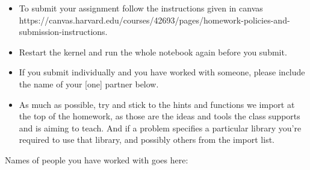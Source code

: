 \documentclass[11pt]{article}
\providecommand{\tightlist}{%
      \setlength{\itemsep}{0pt}\setlength{\parskip}{0pt}}
\begin{document}
\begin{itemize}
\tightlist
\item
  To submit your assignment follow the instructions given in canvas
  https://canvas.harvard.edu/courses/42693/pages/homework-policies-and-submission-instructions.
\item
  Restart the kernel and run the whole notebook again before you submit.
\item
  If you submit individually and you have worked with someone, please
  include the name of your {[}one{]} partner below.
\item
  As much as possible, try and stick to the hints and functions we
  import at the top of the homework, as those are the ideas and tools
  the class supports and is aiming to teach. And if a problem specifies
  a particular library you're required to use that library, and possibly
  others from the import list.
\end{itemize}

    Names of people you have worked with goes here:

    
\end{document}
